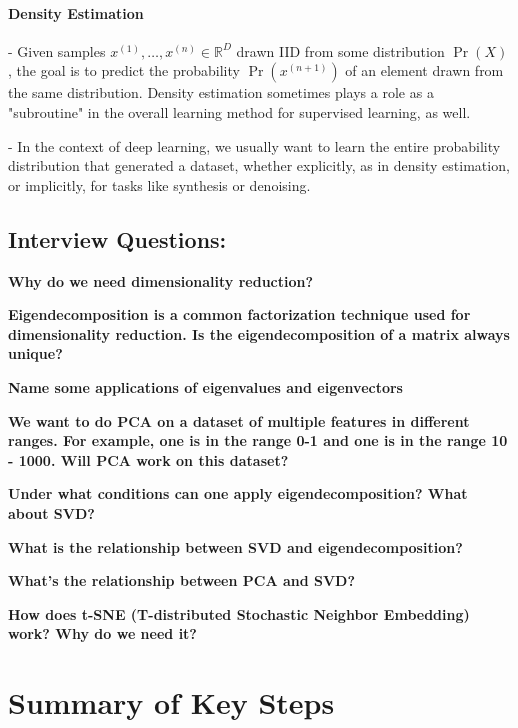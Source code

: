 \documentclass[openany]{book}
\begin{document}
\subsubsection{Density Estimation}

- Given samples $x^{(1)}, \ldots, x^{(n)} \in \mathbb{R}^{D}$ drawn IID from some distribution $\operatorname{Pr}(X)$, the goal is to predict the probability $\operatorname{Pr}\left(x^{(n+1)}\right)$ of an element drawn from the same distribution. Density estimation sometimes plays a role as a "subroutine" in the overall learning method for supervised learning, as well.

-  In the context of deep learning, we usually want to learn the entire probability distribution that generated a dataset, whether explicitly, as in density estimation, or implicitly, for tasks like synthesis or denoising. 



\section{Interview Questions:}

\textbf{Why do we need dimensionality reduction?}

\textbf{ Eigendecomposition is a common factorization technique used for dimensionality reduction. Is the eigendecomposition of a matrix always unique?}


\textbf{ Name some applications of eigenvalues and eigenvectors}

\textbf{We want to do PCA on a dataset of multiple features in different ranges. For example, one is in the range 0-1 and one is in the range 10 - 1000. Will PCA work on this dataset?}

\textbf{ Under what conditions can one apply eigendecomposition? What about SVD?}

\textbf{What is the relationship between SVD and eigendecomposition?}

\textbf{What’s the relationship between PCA and SVD?}

\textbf{How does t-SNE (T-distributed Stochastic Neighbor Embedding) work? Why do we need it?}


\chapter{Summary of Key Steps}


\end{document}
